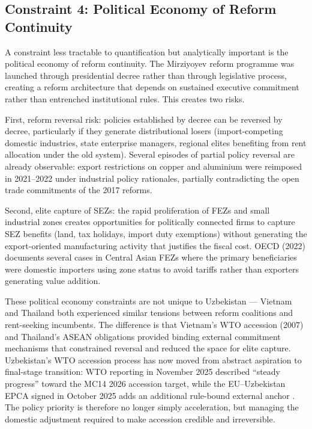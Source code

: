 \subsection{Constraint 4: Political Economy of Reform Continuity}

A constraint less tractable to quantification but analytically important is the political economy of reform continuity. The Mirziyoyev reform programme was launched through presidential decree rather than through legislative process, creating a reform architecture that depends on sustained executive commitment rather than entrenched institutional rules. This creates two risks.

First, reform reversal risk: policies established by decree can be reversed by decree, particularly if they generate distributional losers (import-competing domestic industries, state enterprise managers, regional elites benefiting from rent allocation under the old system). Several episodes of partial policy reversal are already observable: export restrictions on copper and aluminium were reimposed in 2021--2022 under industrial policy rationales, partially contradicting the open trade commitments of the 2017 reforms.

Second, elite capture of SEZs: the rapid proliferation of FEZs and small industrial zones creates opportunities for politically connected firms to capture SEZ benefits (land, tax holidays, import duty exemptions) without generating the export-oriented manufacturing activity that justifies the fiscal cost. OECD (2022) documents several cases in Central Asian FEZs where the primary beneficiaries were domestic importers using zone status to avoid tariffs rather than exporters generating value addition.

These political economy constraints are not unique to Uzbekistan --- Vietnam and Thailand both experienced similar tensions between reform coalitions and rent-seeking incumbents. The difference is that Vietnam's WTO accession (2007) and Thailand's ASEAN obligations provided binding external commitment mechanisms that constrained reversal and reduced the space for elite capture. Uzbekistan's WTO accession process has now moved from abstract aspiration to final-stage transition: WTO reporting in November 2025 described ``steady progress'' toward the MC14 2026 accession target, while the EU--Uzbekistan EPCA signed in October 2025 adds an additional rule-bound external anchor \citep{wto2025uzbekistan, uzbekistan2025epca}. The policy priority is therefore no longer simply acceleration, but managing the domestic adjustment required to make accession credible and irreversible.

